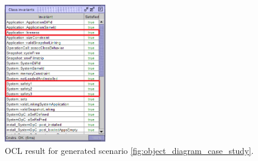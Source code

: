 \begin{figure}
    \centering
    \includegraphics[width=0.4\textwidth]{figures/c3/OCL_result_full_edited.png}
    \caption{OCL result for generated scenario \ref{fig:object_diagram_case_study}.}
    \label{fig:ocl_result_case_study}
\end{figure}